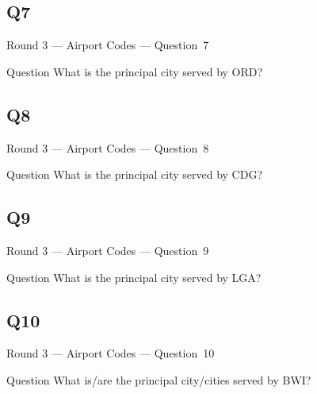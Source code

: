 \documentclass[11pt]{beamer}
\begin{document}
\subsection*{Q7}
\begin{frame}[t]{Round 3 --- Airport Codes --- \mbox{Question 7}}
\begin{block}{Question}
What is the principal city served by ORD\@?
\end{block}
\end{frame}
\subsection*{Q8}
\begin{frame}[t]{Round 3 --- Airport Codes --- \mbox{Question 8}}
\begin{block}{Question}
What is the principal city served by CDG\@?
\end{block}
\end{frame}
\subsection*{Q9}
\begin{frame}[t]{Round 3 --- Airport Codes --- \mbox{Question 9}}
\begin{block}{Question}
What is the principal city served by LGA\@?
\end{block}
\end{frame}
\subsection*{Q10}
\begin{frame}[t]{Round 3 --- Airport Codes --- \mbox{Question 10}}
\begin{block}{Question}
What is/are the principal city/cities served by BWI\@?
\end{block}
\end{frame}
\end{document}
